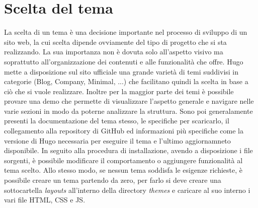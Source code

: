 \documentclass[target=bach,aauheader=]{thud}
\begin{document}
\section{Scelta del tema}
La scelta di un tema è una decisione importante nel processo di sviluppo di un sito web, la cui scelta dipende ovviamente del tipo di progetto che si sta realizzando. 
La sua importanza non è dovuta solo all'aspetto visivo ma soprattutto all'organizzazione dei contenuti e alle funzionalità che offre.
\newline
Hugo mette a disposizione sul sito ufficiale una grande varietà di temi suddivisi in categorie (Blog, Company, Minimal, ...) che facilitano quindi la scelta in base a ciò che si vuole realizzare. 
Inoltre per la maggior parte dei temi è possibile provare una demo che permette di visualizzare l'aspetto generale e navigare nelle varie sezioni in modo da poterne analizzare la struttura. Sono poi generalamente presenti la documentazione del tema stesso, le specifiche per scaricarlo, il collegamento alla repository di GitHub
ed informazioni più specifiche come la versione di Hugo necessaria per eseguire il tema e l'ultimo aggiornamneto disponibile.
\newline
In seguito alla procedura di installazione, avendo a disposizione i file sorgenti, è possibile modificare il comportamento o aggiungere funzionalità al tema scelto. Allo stesso modo, se nessun tema soddisfa le esigenze richieste, è possibile creare un tema partendo da zero, per farlo si deve creare una sottocartella \textit{layouts} all'interno della directory \textit{themes}
e caricare al suo interno i vari file HTML, CSS e JS.
\end{document}
